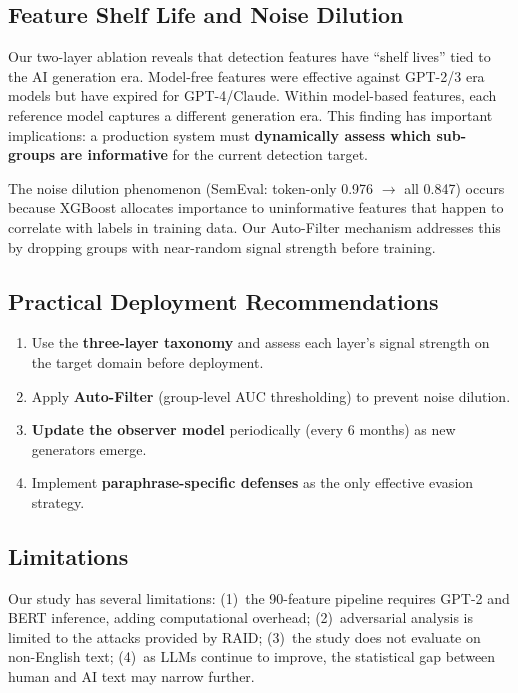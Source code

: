 \documentclass[sigconf,nonacm]{acmart}
\begin{document}
\subsection{Feature Shelf Life and Noise Dilution}

Our two-layer ablation reveals that detection features have ``shelf lives'' tied to the AI generation era. Model-free features were effective against GPT-2/3 era models but have expired for GPT-4/Claude. Within model-based features, each reference model captures a different generation era. This finding has important implications: a production system must \textbf{dynamically assess which sub-groups are informative} for the current detection target.

The noise dilution phenomenon (SemEval: token-only 0.976 $\rightarrow$ all 0.847) occurs because XGBoost allocates importance to uninformative features that happen to correlate with labels in training data. Our Auto-Filter mechanism addresses this by dropping groups with near-random signal strength before training.

\subsection{Practical Deployment Recommendations}

\begin{enumerate}
    \item Use the \textbf{three-layer taxonomy} and assess each layer's signal strength on the target domain before deployment.
    \item Apply \textbf{Auto-Filter} (group-level AUC thresholding) to prevent noise dilution.
    \item \textbf{Update the observer model} periodically (every 6 months) as new generators emerge.
    \item Implement \textbf{paraphrase-specific defenses} as the only effective evasion strategy.
\end{enumerate}

\subsection{Limitations}

Our study has several limitations: (1)~the 90-feature pipeline requires GPT-2 and BERT inference, adding computational overhead; (2)~adversarial analysis is limited to the attacks provided by RAID; (3)~the study does not evaluate on non-English text; (4)~as LLMs continue to improve, the statistical gap between human and AI text may narrow further.
\end{document}
